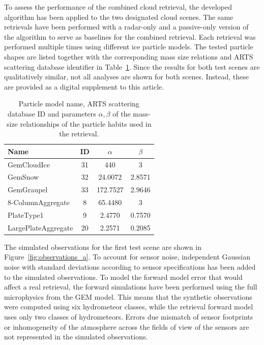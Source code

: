 \documentclass[journal abbreviation, manuscript]{copernicus}
\begin{document}
To assess the performance of the combined cloud retrieval, the developed
algorithm has been applied to the two designated cloud scenes. The same
retrievals have been performed with a radar-only and a passive-only version of
the algorithm to serve as baselines for the combined retrieval. Each retrieval
was performed multiple times using different ice particle models. The tested
particle shapes are listed together with the corresponding mass size relations
and ARTS scattering database identifier in Table~\ref{tab:particles_retrieval}.
Since the results for both test scenes are qualitatively similar, not all
analyses are shown for both scenes. Instead, these are provided as a digital
supplement to this article.

\begin{table}
  \centering
  \caption{Particle model name, ARTS scattering database ID and parameters
    $\alpha, \beta$ of the mass-size relationships of the particle habits used
    in the retrieval.}
  \begin{tabular}{l|c|c|c}
    Name & ID & $\alpha$ & $\beta$ \\
    \hline
    GemCloudIce         & 31  & 440      & 3 \\
    GemSnow             & 32  & 24.0072  & 2.8571 \\
    GemGraupel          & 33  & 172.7527 & 2.9646 \\
    8-ColumnAggregate   &  8  & 65.4480  & 3      \\
    PlateType1          &  9  & 2.4770   & 0.7570 \\
    LargePlateAggregate &  20 & 2.2571   & 0.2085 \\
  \end{tabular}
  \label{tab:particles_retrieval}
\end{table}

The simulated observations for the first test scene are shown in
Figure~\ref{fig:observations_a}. To account for sensor noise, independent
Gaussian noise with standard deviations according to sensor specifications has
been added to the simulated observations. To model the forward model error that
would affect a real retrieval, the forward simulations have been performed using
the full microphysics from the GEM model. This means that the synthetic
observations were computed using six hydrometeor classes, while the retrieval
forward model uses only two classes of hydrometeors. Errors due mismatch of
sensor footprints or inhomogeneity of the atmosphere across the fields of view
of the sensors are not represented in the simulated observations.
\end{document}
